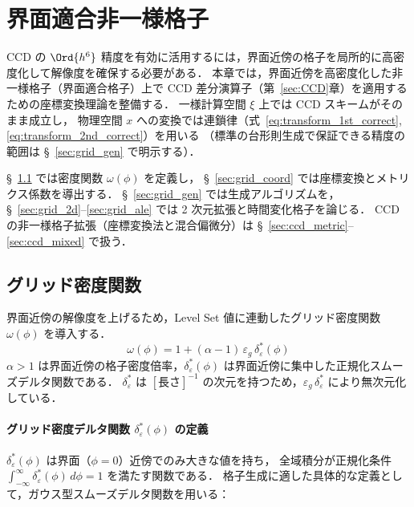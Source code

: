\section{界面適合非一様格子}
\label{sec:grid}

CCD の $\Ord{h^6}$ 精度を有効に活用するには，界面近傍の格子を局所的に高密度化して解像度を確保する必要がある．
本章では，界面近傍を高密度化した非一様格子（界面適合格子）上で
CCD 差分演算子（第~\ref{sec:CCD}章）を適用するための座標変換理論を整備する．
一様計算空間 $\xi$ 上では CCD スキームがそのまま成立し，
物理空間 $x$ への変換では連鎖律（式~\eqref{eq:transform_1st_correct}, \eqref{eq:transform_2nd_correct}）を用いる
（標準の台形則生成で保証できる精度の範囲は §~\ref{sec:grid_gen} で明示する）．

§~\ref{sec:grid_density} では密度関数 $\omega(\phi)$ を定義し，
§~\ref{sec:grid_coord} では座標変換とメトリクス係数を導出する．
§~\ref{sec:grid_gen} では生成アルゴリズムを，§~\ref{sec:grid_2d}–\ref{sec:grid_ale} では
2 次元拡張と時間変化格子を論じる．
CCD の非一様格子拡張（座標変換法と混合偏微分）は §~\ref{sec:ccd_metric}–\ref{sec:ccd_mixed} で扱う．

\subsection{グリッド密度関数}
\label{sec:grid_density}

界面近傍の解像度を上げるため，Level Set 値に連動したグリッド密度関数 $\omega(\phi)$ を導入する．
\begin{equation}
  \omega(\phi) = 1 + (\alpha - 1)\,\varepsilon_g\,\delta_\varepsilon^*(\phi)
\end{equation}
$\alpha > 1$ は界面近傍の格子密度倍率，$\delta_\varepsilon^*(\phi)$ は界面近傍に集中した正規化スムーズデルタ関数である．
$\delta_\varepsilon^*$ は $[\text{長さ}]^{-1}$ の次元を持つため，$\varepsilon_g\,\delta_\varepsilon^*$ により無次元化している．

\paragraph{グリッド密度デルタ関数 \texorpdfstring{$\delta_\varepsilon^*(\phi)$}{delta*eps(phi)} の定義}

$\delta_\varepsilon^*(\phi)$ は界面（$\phi=0$）近傍でのみ大きな値を持ち，
全域積分が正規化条件 $\int_{-\infty}^{\infty}\delta_\varepsilon^*(\phi)\,d\phi = 1$ を満たす関数である．
格子生成に適した具体的な定義として，ガウス型スムーズデルタ関数を用いる：


